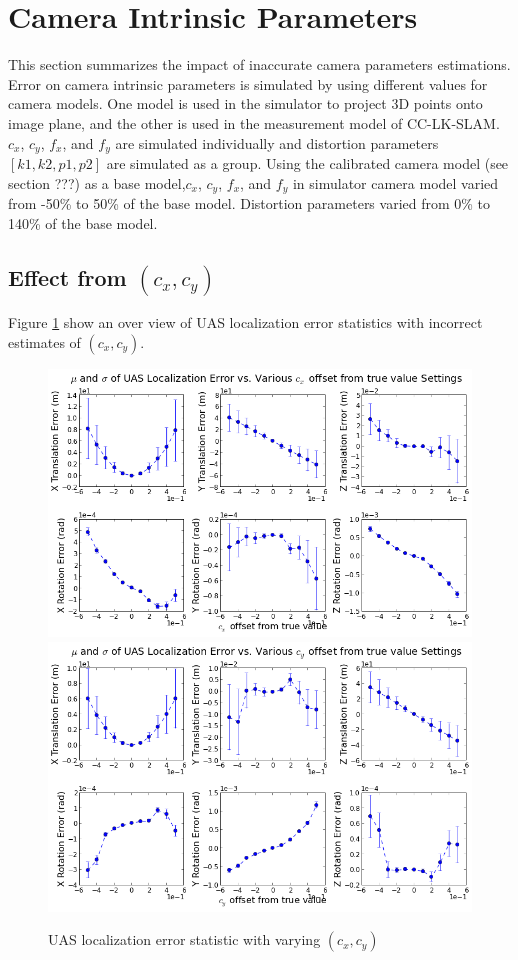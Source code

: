 \section{Camera Intrinsic Parameters}
This section summarizes the impact of inaccurate camera parameters 
estimations. Error on camera intrinsic parameters is simulated by using 
different values for camera models. One model is used in the simulator 
to project 3D points onto image plane, and the other is used in the 
measurement model of CC-LK-SLAM. $c_{x}$, $c_{y}$, $f_{x}$, and 
$f_{y}$ are simulated individually and distortion parameters $[k1, 
k2, p1, p2]$ are simulated as a group. Using the calibrated camera 
model (see section ???) as a base model,$ c_{x}$, $c_{y}$, $f_{x}
$, and $f_{y}$ in simulator camera model varied from -50\% to 50\% of 
the base model. Distortion parameters varied from 0\% to 140\% of the 
base model. 

\subsection{Effect from $(c_{x}, c_{y})$}

Figure \ref{fig:simfig34-35} show an over view of UAS localization
error statistics with incorrect estimates of $ (c_{x}, c_{y})$.

\begin{figure}[h]
  \centering
  \includegraphics[scale=0.5]{./Figures/SimulationFigures/Figure34.png}
  \includegraphics[scale=0.5]{./Figures/SimulationFigures/Figure35.png}
  \caption{UAS localization error statistic with varying $(c_x, c_y)$}
  \label{fig:simfig34-35}
\end{figure}

